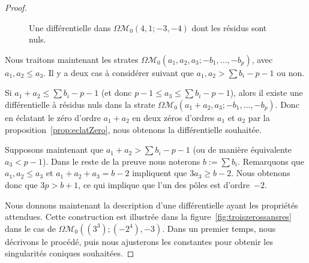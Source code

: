 \documentclass[11pt]{article}
\numberwithin{equation}{section}\renewcommand{\proofname}{Démonstration}
\let\mathcal\mathscr
\newcommand{\omoduli}[1][g]{{\Omega\mathcal M}_{\!#1}}
\theoremstyle{definition}
\begin{document}
\begin{proof}
\begin{figure}[htb]
\caption{Une différentielle dans $\omoduli[0](4,1;-3,-4)$ dont les résidus sont nuls.} \label{fig:ordremax}
\end{figure}
Nous traitons maintenant les strates $\omoduli[0](a_{1},a_{2},a_{3};-b_{1},\dots,-b_{p})$, avec \hbox{$a_{1}, a_{2}\!\leq\!a_{3}$}. Il y a deux cas à considérer suivant que $a_{1},a_{2}>\sum b_{i}-p-1$ ou non.
\par
Si $a_{1}+a_{2}\leq \sum b_{i}-p-1$ (et donc $p-1\leq a_{3} \leq \sum b_{i}-p-1$), alors il existe une différentielle à résidus nuls dans la strate $\omoduli[0](a_{1}+a_{2},a_{3};-b_{1},\dots,-b_{p})$. Donc en éclatant le zéro d'ordre $a_{1}+a_{2}$ en deux zéros d'ordres $a_{1}$ et $a_{2}$ par la proposition~\ref{prop:eclatZero}, nous obtenons la différentielle souhaitée.
\par
Supposons maintenant que $a_{1}+a_{2} > \sum b_{i}-p-1$ (ou de manière équivalente $a_{3}<p-1$). Dans le reste de la preuve nous noterons $b:=\sum b_{i}$. Remarquons que $a_{1},a_{2}\leq a_{3}$ et $a_{1}+a_{2}+a_{3}=b-2$ impliquent que $ 3a_{3} \geq b-2$. Nous obtenons donc que $3p>b+1$, ce qui implique que l'un des pôles est d'ordre~$-2$.
\par
Nous donnons maintenant la description d'une différentielle ayant les propriétés attendues. Cette construction est illustrée dans la figure~\ref{fig:troiszerossansres} dans le cas de $\omoduli[0]((3^3);(-2^4),-3)$. Dans un premier temps, nous décrivons le procédé, puis nous ajusterons les constantes pour obtenir les singularités coniques souhaitées.


\end{proof}
\end{document}
